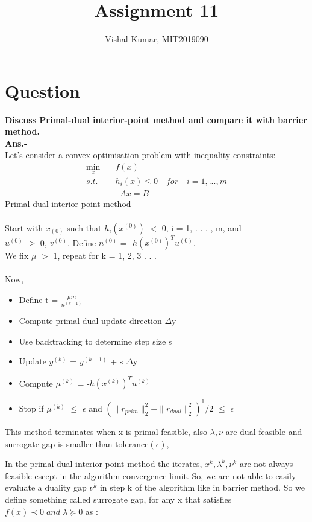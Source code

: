 \documentclass[fleqn]{article}
\title{Assignment 11}
\author{Vishal Kumar, MIT2019090}
\date{}
\begin{document}
\maketitle
\section*{Question}
{\bf Discuss Primal-dual interior-point method and compare it with barrier method.}
\\
{\bf Ans.-}
\\
Let's consider a convex optimisation problem with inequality constraints:
\begin{align*}
\min_{x}\quad& f(x)\\
s.t. \quad& h_{i}(x) \le 0\quad for\quad i = 1,...,m\\
& \;\; Ax = B
\end{align*}
Primal-dual interior-point method
\\
\\
Start with $x_{(0)}$ such that
$h_i(x^{(0)})$ $<$ 0, i = 1, . . . , m, and
\\
$u^{(0)}$ $>$ 0, $v^{(0)}$. Define $n^{(0)}$ = -$h(x^{(0)})^T u^{(0)}$. 
\\
We fix $\mu$ $>$ 1, repeat for k = 1, 2, 3 . . .
\\
\\
Now,
\begin{itemize}
    \item Define t = $\frac{\mu m}{n^(k-1)}$
    
    \item Compute primal-dual update direction $\Delta$y

    \item Use backtracking to determine step size s
    
    \item Update $y^{(k)}$ = $y^{(k-1)}$ + s $\Delta$y
    
    \item Compute $\mu^{(k)}$ = -$h(x^{(k)})^T u^{(k)}$

    \item Stop if $\mu^{(k)}$ $\le$ $\epsilon$ and $(\parallel r_{prim}\parallel_{2}^{2} + \parallel r_{dual}\parallel_2^2)^1/2$ $\le$ $\epsilon$
\end{itemize}

This method terminates when x is primal feasible, also $\lambda, \nu$ are dual feasible and surrogate gap is smaller than tolerance$(\epsilon)$,

In the primal-dual interior-point method the iterates, $x^k, \lambda^k, \nu^k$ are not always feasible escept in the algorithm convergence limit. So, we are not able to easily evaluate a duality gap $\nu^k$ in step k of the algorithm like in barrier method. So we define something called surrogate gap, for any x that satisfies $f(x) \prec 0 \; and \; \lambda \succeq 0 $ as : 
\end{document}
